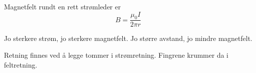 Magnetfelt rundt en rett strømleder er
$$B = \frac{\mu_0 I}{2\pi r}$$

Jo sterkere strøm, jo sterkere magnetfelt.
Jo større avstand, jo mindre magnetfelt.

Retning finnes ved å legge tommer i strømretning.
Fingrene krummer da i feltretning.
